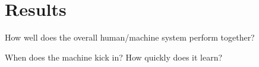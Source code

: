 \documentclass[twocolumn]{aastex6}
\begin{document}

\section{Results} \label{sec: results}
How well does the overall human/machine system perform together? 

When does the machine kick in? How quickly does it learn? 
\end{document}
